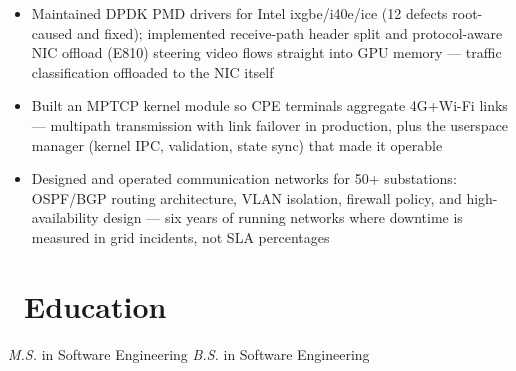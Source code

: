 \documentclass{resume}
\begin{document}
\begin{singlespacing}
\begin{itemize}
	\item Maintained DPDK PMD drivers for Intel ixgbe/i40e/ice (12 defects root-caused and fixed); implemented receive-path header split and protocol-aware NIC offload (E810) steering video flows straight into GPU memory --- traffic classification offloaded to the NIC itself
\end{itemize}
\end{singlespacing}

\begin{singlespacing}
\begin{itemize}
	\item Built an MPTCP kernel module so CPE terminals aggregate 4G+Wi-Fi links --- multipath transmission with link failover in production, plus the userspace manager (kernel IPC, validation, state sync) that made it operable
\end{itemize}
\end{singlespacing}

\begin{singlespacing}
\begin{itemize}
	\item Designed and operated communication networks for 50+ substations: OSPF/BGP routing architecture, VLAN isolation, firewall policy, and high-availability design --- six years of running networks where downtime is measured in grid incidents, not SLA percentages
\end{itemize}
\end{singlespacing}

\section{\faGraduationCap\ Education}
\textit{M.S.} in Software Engineering
\textit{B.S.} in Software Engineering
\end{document}
